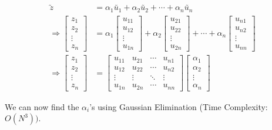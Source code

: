 \documentclass[10pt, aspectratio=169]{beamer}
\begin{document}
\begin{frame}
\begin{align*}
\utilde{z} &= \alpha_1 \utilde{u_1} + \alpha_2 \utilde{u_2} + \cdots + \alpha_n \utilde{u_n} \\[1.5em]
\Rightarrow \begin{bmatrix}
z_1 \\
z_2 \\
\vdots \\
z_n
\end{bmatrix}
&=
\alpha_1
\begin{bmatrix}
u_{11} \\
u_{12} \\
\vdots \\
u_{1n}
\end{bmatrix}
+
\alpha_2
\begin{bmatrix}
u_{21} \\
u_{22} \\
\vdots \\
u_{2n}
\end{bmatrix}
+ \cdots +
\alpha_n
\begin{bmatrix}
u_{n1} \\
u_{n2} \\
\vdots \\
u_{nn}
\end{bmatrix}
\\[1.5em]
\Rightarrow \begin{bmatrix}
z_1 \\
z_2 \\
\vdots \\
z_n
\end{bmatrix}
&=
\begin{bmatrix}
u_{11} & u_{21} & \cdots & u_{n1} \\
u_{12} & u_{22} & \cdots & u_{n2} \\
\vdots & \vdots & \ddots & \vdots \\
u_{1n} & u_{2n} & \cdots & u_{nn}
\end{bmatrix}
\begin{bmatrix}
\alpha_1 \\
\alpha_2 \\
\vdots \\
\alpha_n
\end{bmatrix}
\end{align*}

We can now find the $\alpha_i$'s using Gaussian Elimination (Time Complexity: $O(N^3))$.
\end{frame}
\end{document}
